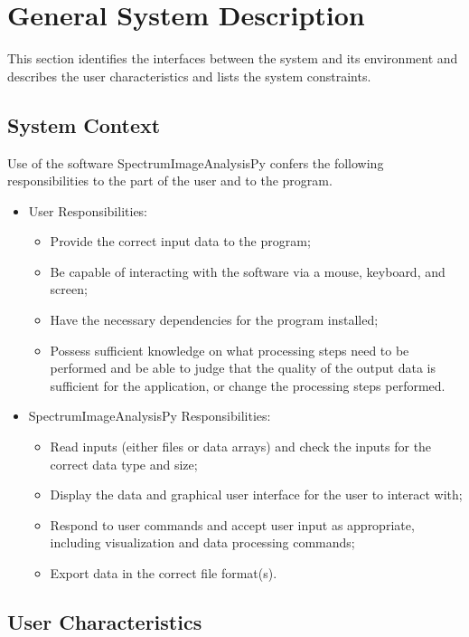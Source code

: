 \documentclass[12pt]{article}
\newcommand{\progname}{SpectrumImageAnalysisPy} %
\begin{document}
\section{General System Description}

This section identifies the interfaces between the system and its environment
and
describes the user characteristics and lists the system constraints.

\subsection{System Context}

Use of the software \progname{} confers the following responsibilities to the
part of the user and to the program.

\begin{itemize}
	\item User Responsibilities:
	\begin{itemize}
		\item Provide the correct input data to the program;
		\item Be capable of interacting with the software via a mouse, keyboard, and
screen;
		\item Have the necessary dependencies for the program installed;
		\item Possess sufficient knowledge on what processing steps need to be
performed and be able to judge that the quality of the output data is sufficient
for the application, or change the processing steps performed.
	\end{itemize}
	\item \progname{} Responsibilities:
	\begin{itemize}
		\item Read inputs (either files or data arrays) and check the inputs for the
correct data type and size;
		\item Display the data and graphical user interface for the user to interact
with;
		\item Respond to user commands and accept user input as appropriate, including
visualization and data processing commands;
		\item Export data in the correct file format(s).
	\end{itemize}
\end{itemize}

\subsection{User Characteristics} \label{SecUserCharacteristics}
\end{document}

